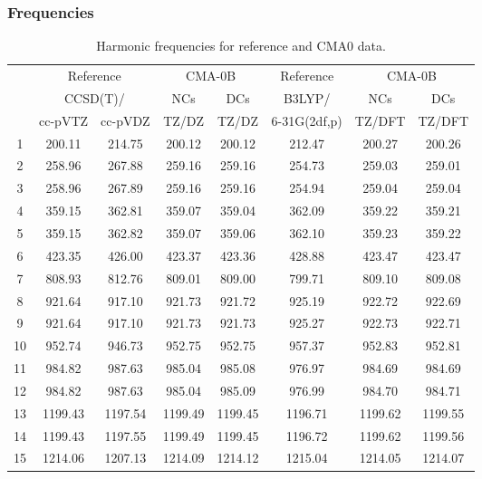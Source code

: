 \documentclass[10pt,oneside]{article}
\begin{document}
\subsubsection*{Frequencies}
\begin{table}[h!]
\centering
\caption{Harmonic frequencies for reference and CMA0 data.}
\begin{tabular}{cccccccc}
\toprule
{} & \multicolumn{2}{c}{Reference} & \multicolumn{2}{c}{CMA-0B} &    Reference & \multicolumn{2}{c}{CMA-0B} \\
{} & \multicolumn{2}{c}{CCSD(T)/} &     NCs &     DCs &       B3LYP/ &     NCs &     DCs \\
{} &   cc-pVTZ & cc-pVDZ &   TZ/DZ &   TZ/DZ & 6-31G(2df,p) &  TZ/DFT &  TZ/DFT \\
\midrule
1  &    200.11 &  214.75 &  200.12 &  200.12 &       212.47 &  200.27 &  200.26 \\
2  &    258.96 &  267.88 &  259.16 &  259.16 &       254.73 &  259.03 &  259.01 \\
3  &    258.96 &  267.89 &  259.16 &  259.16 &       254.94 &  259.04 &  259.04 \\
4  &    359.15 &  362.81 &  359.07 &  359.04 &       362.09 &  359.22 &  359.21 \\
5  &    359.15 &  362.82 &  359.07 &  359.06 &       362.10 &  359.23 &  359.22 \\
6  &    423.35 &  426.00 &  423.37 &  423.36 &       428.88 &  423.47 &  423.47 \\
7  &    808.93 &  812.76 &  809.01 &  809.00 &       799.71 &  809.10 &  809.08 \\
8  &    921.64 &  917.10 &  921.73 &  921.72 &       925.19 &  922.72 &  922.69 \\
9  &    921.64 &  917.10 &  921.73 &  921.73 &       925.27 &  922.73 &  922.71 \\
10 &    952.74 &  946.73 &  952.75 &  952.75 &       957.37 &  952.83 &  952.81 \\
11 &    984.82 &  987.63 &  985.04 &  985.08 &       976.97 &  984.69 &  984.69 \\
12 &    984.82 &  987.63 &  985.04 &  985.09 &       976.99 &  984.70 &  984.71 \\
13 &   1199.43 & 1197.54 & 1199.49 & 1199.45 &      1196.71 & 1199.62 & 1199.55 \\
14 &   1199.43 & 1197.55 & 1199.49 & 1199.45 &      1196.72 & 1199.62 & 1199.56 \\
15 &   1214.06 & 1207.13 & 1214.09 & 1214.12 &      1215.04 & 1214.05 & 1214.07 \\

\end{tabular}
\end{table}
\end{document}
